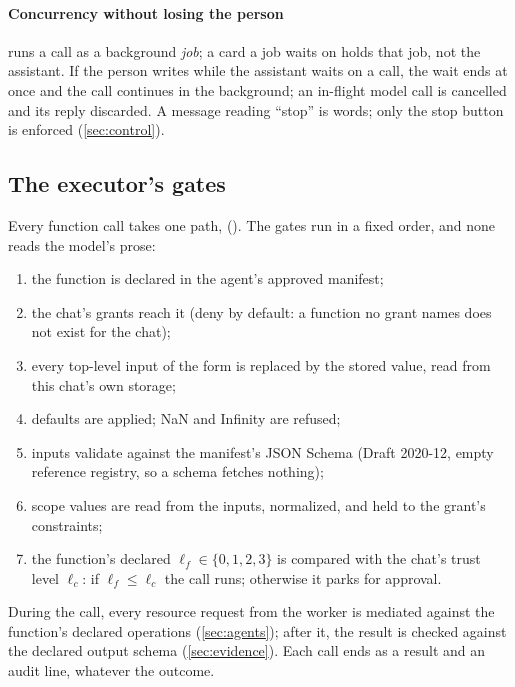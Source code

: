 \paragraph{Concurrency without losing the person}
 runs a call as a background \emph{job}; a card a job
waits on holds that job, not the assistant. If the person writes while
the assistant waits on a call, the wait ends at once and the call
continues in the background; an in-flight model call is cancelled and
its reply discarded. A message reading ``stop'' is words; only the stop
button is enforced (\cref{sec:control}).

\subsection{The executor's gates}

Every function call takes one path, 
(). The gates run in a fixed
order, and none reads the model's prose:

\begin{enumerate}[label=\textbf{E\arabic*},leftmargin=2.1em]
\item the function is declared in the agent's approved manifest;
\item the chat's grants reach it (deny by default: a function no grant
  names does not exist for the chat);
\item every top-level input of the form 
  is replaced by the stored value, read from this chat's own storage;
\item defaults are applied; NaN and Infinity are refused;
\item inputs validate against the manifest's JSON Schema (Draft
  2020-12, empty reference registry, so a schema fetches nothing);
\item scope values are read from the inputs, normalized, and held to the
  grant's constraints;
\item the function's declared  $\ell_f \in
  \{0,1,2,3\}$ is compared with the chat's trust level $\ell_c$: if
  $\ell_f \le \ell_c$ the call runs; otherwise it parks for approval.
\end{enumerate}

\noindent During the call, every resource request from the worker is
mediated against the function's declared operations (\cref{sec:agents});
after it, the result is checked against the declared output schema
(\cref{sec:evidence}). Each call ends as a result and an audit line,
whatever the outcome.


